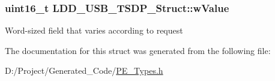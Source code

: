 \subsubsection[{w\+Value}]{\setlength{\rightskip}{0pt plus 5cm}uint16\+\_\+t L\+D\+D\+\_\+\+U\+S\+B\+\_\+\+T\+S\+D\+P\+\_\+\+Struct\+::w\+Value}\label{struct_l_d_d___u_s_b___t_s_d_p___struct_abe97822a1a8976f53da5a43b8db8cfd3}
Word-\/sized field that varies according to request 

The documentation for this struct was generated from the following file\+:\begin{DoxyCompactItemize}
\item 
D\+:/\+Project/\+Generated\+\_\+\+Code/\hyperlink{_p_e___types_8h}{P\+E\+\_\+\+Types.\+h}\end{DoxyCompactItemize}
